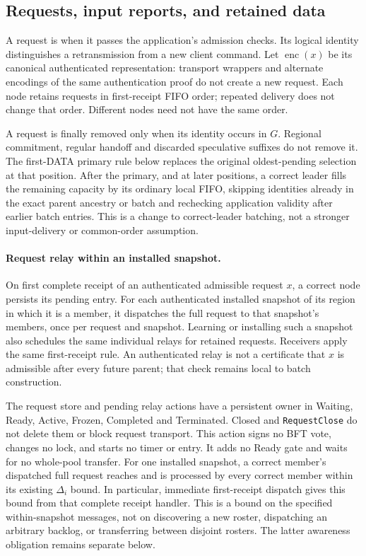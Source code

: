 \subsection{Requests, input reports, and retained data}
\label{sec:requests}
A request is  when it passes the application's admission
checks. Its logical identity distinguishes a retransmission from a new
client command. Let $\operatorname{enc}(x)$ be its canonical authenticated
representation: transport wrappers and alternate encodings of the same
authentication proof do not create a new request. Each node retains
requests in first-receipt FIFO order; repeated delivery does not change
that order. Different nodes need not have the same order.

A request is finally removed only when its identity occurs in $G$.
Regional commitment, regular handoff and discarded speculative suffixes
do not remove it. The first-DATA primary rule below replaces the original
oldest-pending selection at that position. After the primary, and at
later positions, a correct leader fills the remaining capacity by its
ordinary local FIFO, skipping identities already in the exact parent
ancestry or batch and rechecking application validity after earlier batch
entries. This is a change to correct-leader batching, not a stronger
input-delivery or common-order assumption.

\paragraph{Request relay within an installed snapshot.}
On first complete receipt of an authenticated admissible request $x$, a
correct node persists its pending entry. For each authenticated installed
snapshot of its region in which it is a member, it dispatches the full
request to that snapshot's members, once per request and snapshot.
Learning or installing such a snapshot also schedules the same individual
relays for retained requests. Receivers apply the same first-receipt rule.
An authenticated relay is not a certificate that $x$ is admissible after
every future parent; that check remains local to batch construction.

The request store and pending relay actions have a persistent owner in
Waiting, Ready, Active, Frozen, Completed and Terminated. Closed and
\texttt{RequestClose} do not delete them or block request transport.
This action signs no BFT vote, changes no lock, and starts no timer or
entry. It adds no Ready gate and waits for no whole-pool transfer.
For one installed snapshot, a correct member's dispatched full request
reaches and is processed by every correct member within its existing
$\Delta_i$ bound. In particular, immediate first-receipt dispatch gives
this bound from that complete receipt handler. This is a bound on the
specified within-snapshot messages, not on discovering a new roster,
dispatching an arbitrary backlog, or transferring between disjoint
rosters. The latter awareness obligation remains separate below.

